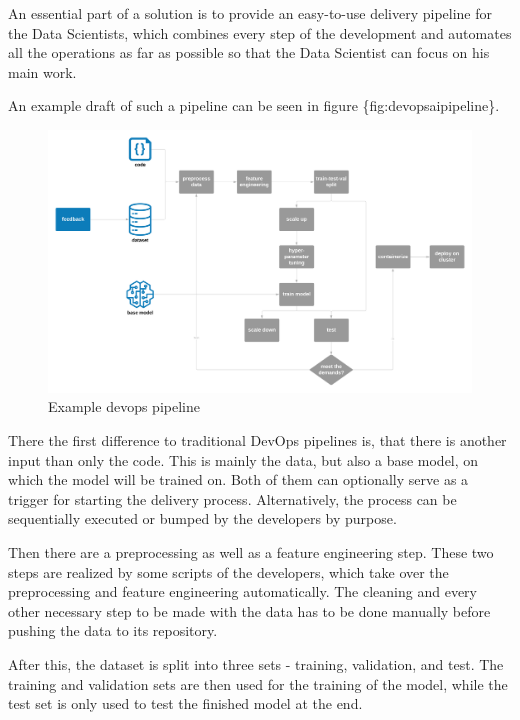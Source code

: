 \documentclass[12pt,english,a4paper,oneside,,tablecaptionabove]{scrbook}
\begin{document}
An essential part of a solution is to provide an easy-to-use delivery
pipeline for the Data Scientists, which combines every step of the
development and automates all the operations as far as possible so that
the Data Scientist can focus on his main work.

An example draft of such a pipeline can be seen in figure
\{fig:devopsaipipeline\}.

\begin{figure}
\hypertarget{fig:devops_architecture}{%
\centering
\includegraphics[width=5.20833in,height=\textheight]{images/chapter2/devops_ai_pipeline.png}
\caption{Example devops pipeline}\label{fig:devops_architecture}
}
\end{figure}

There the first difference to traditional DevOps pipelines is, that
there is another input than only the code. This is mainly the data, but
also a base model, on which the model will be trained on. Both of them
can optionally serve as a trigger for starting the delivery process.
Alternatively, the process can be sequentially executed or bumped by the
developers by purpose.

Then there are a preprocessing as well as a feature engineering step.
These two steps are realized by some scripts of the developers, which
take over the preprocessing and feature engineering automatically. The
cleaning and every other necessary step to be made with the data has to
be done manually before pushing the data to its repository.

After this, the dataset is split into three sets - training, validation,
and test. The training and validation sets are then used for the
training of the model, while the test set is only used to test the
finished model at the end.
\end{document}
